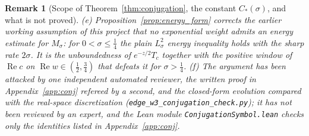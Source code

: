\documentclass[11pt,a4paper]{article}
\newtheorem{remark}{Remark}
\begin{document}
\begin{remark}[Scope of Theorem~\ref{thm:conjugation}, the constant $C_*(\sigma)$, and what is not proved]
(e) Proposition~\ref{prop:energy_form} corrects the earlier working assumption of this project that no exponential weight
admits an energy estimate for $M_\sigma$: for $0<\sigma\le\tfrac14$ the plain $L^2_\sigma$ energy inequality holds with the
sharp rate $2\sigma$.  It is the unboundedness of $e^{-z/2}T_c$ together with the positive window of
$\operatorname{Re}c$ on $\operatorname{Re}w\in(\tfrac12,\tfrac34)$ that defeats it for $\sigma>\tfrac14$.
(f) The argument has been attacked by one independent automated reviewer, the written proof in Appendix~\ref{app:conj} refereed by a second, and the closed-form evolution compared with the
real-space discretization (\texttt{edge\_w3\_conjugation\_check.py}); it has not been reviewed by an expert, and the
Lean module \texttt{ConjugationSymbol.lean} checks only the identities listed in Appendix~\ref{app:conj}.
\end{remark}
\end{document}
